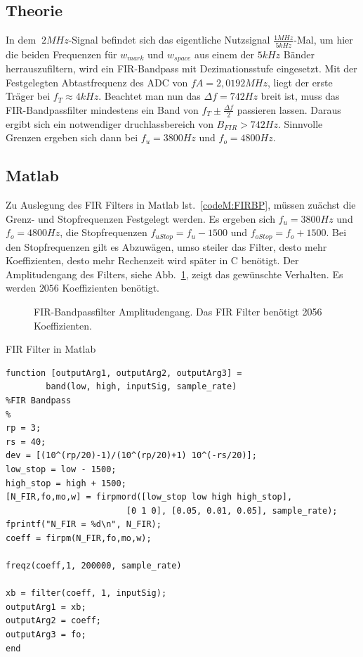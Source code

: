 \documentclass{article}
\begin{document}
\subsection{Theorie}
In dem $~2MHz$-Signal befindet sich das eigentliche Nutzsignal $\frac{1MHz}{5kHz}$-Mal, um hier die beiden Frequenzen für $w_{mark}$ und $w_{space}$
aus einem der $5kHz$ Bänder herrauszufiltern, wird ein FIR-Bandpass mit Dezimationsstufe eingesetzt. Mit der Festgelegten Abtastfrequenz des ADC von $fA = 2,0192MHz$,
liegt der erste Träger bei $f_T \approx 4kHz$. Beachtet man nun das $\varDelta f = 742Hz$ breit ist, muss das FIR-Bandpassfilter mindestens ein Band von
$f_T \pm \frac{\varDelta f}{2}$ passieren lassen. Daraus ergibt sich ein notwendiger druchlassbereich von $B_{FIR} > 742Hz$. 
Sinnvolle Grenzen ergeben sich dann bei $f_u = 3800Hz$ und $f_o = 4800Hz$.


\subsection{Matlab}
Zu Auslegung des FIR Filters in Matlab lst.~\ref{codeM:FIRBP}, müssen zuächst die Grenz- und Stopfrequenzen Festgelegt werden.
Es ergeben sich $f_u = 3800Hz$ und $f_o = 4800Hz$, die Stopfrequenzen $f_{uStop} = f_u - 1500$ und $f_{oStop} = f_o + 1500$.
Bei den Stopfrequenzen gilt es Abzuwägen, umso steiler das Filter, desto mehr Koeffizienten, desto mehr Rechenzeit wird später in C
benötigt.
Der Amplitudengang des Filters, siehe Abb.~\ref{fig:fir_ampli}, zeigt das gewünschte Verhalten. Es werden $2056$ Koeffizienten benötigt.


\begin{figure}[!h]
    \label{fig:fir_ampli}
    \centering
    \def\svgscale{0.3}
    \def\svgwidth{\columnwidth}
    
    \caption{FIR-Bandpassfilter Amplitudengang. Das FIR Filter benötigt 2056 Koeffizienten.}
\end{figure}
\begin{listing}\label{codeM:FIRBP}
    \caption{FIR Filter in Matlab}
    \begin{verbatim}
function [outputArg1, outputArg2, outputArg3] = 
        band(low, high, inputSig, sample_rate)
%FIR Bandpass
%
rp = 3; 
rs = 40;
dev = [(10^(rp/20)-1)/(10^(rp/20)+1) 10^(-rs/20)]; 
low_stop = low - 1500;
high_stop = high + 1500;
[N_FIR,fo,mo,w] = firpmord([low_stop low high high_stop], 
                        [0 1 0], [0.05, 0.01, 0.05], sample_rate);
fprintf("N_FIR = %d\n", N_FIR);
coeff = firpm(N_FIR,fo,mo,w);

freqz(coeff,1, 200000, sample_rate)

xb = filter(coeff, 1, inputSig);
outputArg1 = xb;
outputArg2 = coeff;
outputArg3 = fo;
end
    \end{verbatim}
\end{listing}
\end{document}
